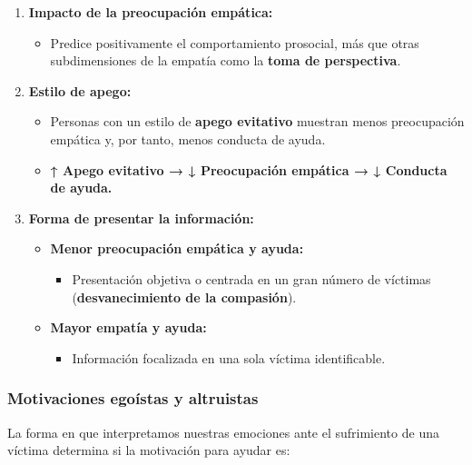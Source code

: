 \documentclass[
]{book}
\providecommand{\tightlist}{%
  \setlength{\itemsep}{0pt}\setlength{\parskip}{0pt}}
\begin{document}
\begin{enumerate}
\def\labelenumi{\arabic{enumi}.}
\tightlist
\item
  \textbf{Impacto de la preocupación empática:}

  \begin{itemize}
  \tightlist
  \item
    Predice positivamente el comportamiento prosocial, más que otras subdimensiones de la empatía como la \textbf{toma de perspectiva}.
  \end{itemize}
\item
  \textbf{Estilo de apego:}

  \begin{itemize}
  \tightlist
  \item
    Personas con un estilo de \textbf{apego evitativo} muestran menos preocupación empática y, por tanto, menos conducta de ayuda.
  \item
    \textbf{↑ Apego evitativo → ↓ Preocupación empática → ↓ Conducta de ayuda.}
  \end{itemize}
\item
  \textbf{Forma de presentar la información:}

  \begin{itemize}
  \tightlist
  \item
    \textbf{Menor preocupación empática y ayuda:}

    \begin{itemize}
    \tightlist
    \item
      Presentación objetiva o centrada en un gran número de víctimas (\textbf{desvanecimiento de la compasión}).
    \end{itemize}
  \item
    \textbf{Mayor empatía y ayuda:}

    \begin{itemize}
    \tightlist
    \item
      Información focalizada en una sola víctima identificable.
    \end{itemize}
  \end{itemize}
\end{enumerate}

\subsubsection{Motivaciones egoístas y altruistas}\label{motivaciones-egouxedstas-y-altruistas}

La forma en que interpretamos nuestras emociones ante el sufrimiento de una víctima determina si la motivación para ayudar es:
\end{document}
